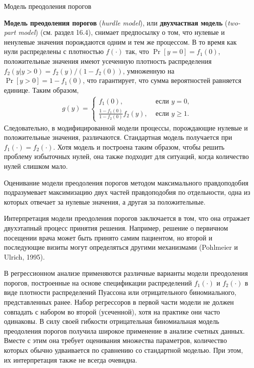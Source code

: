         \begin{center}{Модель преодоления порогов}\end{center} %
\noindent
\textbf{Модель преодоления порогов} (\textit{hurdle model}), или \textbf{двухчастная модель} (\textit{two-part model}) (см. раздел 16.4), снимает %
предпосылку о том, что нулевые и ненулевые значения порождаются одним и тем же процессом.
В то время как нули распределены с плотностью $f(\cdot)$ так, что $\Pr[y = 0] = f_1(0)$, положительные значения имеют усеченную плотность распределения $f_2(y|y > 0) = f_2(y) / (1 - f_2(0))$, умноженную на $\Pr[y > 0] = 1 - f_1(0)$, что гарантирует, что сумма вероятностей равняется единице. Таким образом,
    \begin{align}\label{eq:20.18}
    g(y) =\begin{cases}
                f_1(0),                                     & \text{ если }y = 0, \\
                \frac{1 - f_1(0)}{1 - f_2(0)} f_2(y),       & \text{ если }y \ge 1.
                \end{cases}
    \end{align}
Следовательно, в модифицированной модели процессы, порождающие нулевые и положительные значения, различаются. Стандартная модель получается при $f_1(\cdot) = f_2(\cdot)$. Хотя модель и построена таким образом, чтобы решить проблему избыточных нулей, она также подходит для ситуаций, когда количество нулей слишком мало.

Оценивание модели преодоления порогов методом максимального правдоподобия подразумевает максимизацию двух частей правдоподобия по отдельности, одна из которых отвечает за нулевые значения, а другая за положительные.

Интерпретация модели преодоления порогов заключается в том, что она отражает двухэтапный процесс принятия решения. Например, решение о первичном посещении врача может быть принято самим пациентом, но второй и последующие визиты могут определяться другими механизмами (Pohlmeier и Ulrich, 1995).

В регрессионном анализе применяются различные варианты модели преодоления порогов, построенные на основе спецификации распределений $f_1(\cdot)$ и $f_2(\cdot)$ в виде плотности распределений Пуассона или отрицательного биномиального, представленных ранее. Набор регрессоров в первой части модели не должен совпадать с набором во второй (усеченной), хотя на практике они часто одинаковы. В силу своей гибкости отрицательная биномиальная модель преодоления порогов получила широкое применение в анализе счетных данных. Вместе с этим она требует оценивания множества параметров, количество которых обычно удваивается по сравнению со стандартной моделью. При этом, их интерпретация также не всегда очевидна.

